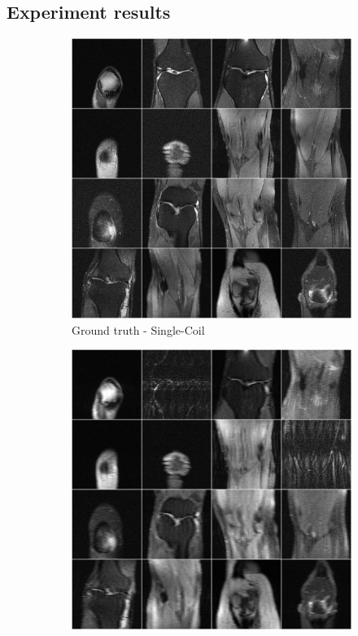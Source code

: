 \documentclass{article}
\begin{document}
\subsection{Experiment results}
\begin{figure}[H] 
\centering
   \begin{subfigure}[]{.5\textwidth}
   \centering
        \includegraphics[width=.95\linewidth]{target}
	\caption{Ground truth  - Single-Coil }
	\vspace*{2mm} 
    \end{subfigure}%
   \begin{subfigure}[]{.5\textwidth}
   \centering
        \includegraphics[width=.95\linewidth]{undersampled}

\end{subfigure}
\end{figure}
\end{document}
